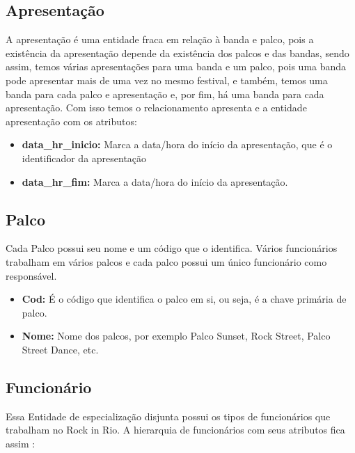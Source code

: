 \documentclass[12pt]{article}
\begin{document}
\subsection{Apresentação}

A apresentação é uma entidade fraca em relação à banda e palco, pois a existência da apresentação depende da existência dos palcos e das bandas, sendo assim, temos várias apresentações para uma banda e um palco, pois uma banda pode apresentar mais de uma vez no mesmo festival, e também, temos uma banda para cada palco e apresentação e, por fim, há uma banda para cada apresentação\cite{Diego}. Com isso temos o relacionamento apresenta e a entidade apresentação com os atributos:
\begin{itemize}
	\item \textbf{data\_hr\_inicio:} Marca a data/hora do início da apresentação, que é o identificador da apresentação
		\item \textbf{data\_hr\_fim:}  Marca a data/hora do início da apresentação.
\end{itemize}

\subsection{Palco}

Cada Palco possui seu nome e um código que o identifica. Vários funcionários trabalham em vários palcos e cada palco possui um único funcionário como responsável.
	\begin{itemize}
		\item \textbf{Cod:} É o código que identifica o palco em si, ou seja, é a chave primária de palco.
		\item \textbf{Nome:} Nome dos palcos, por exemplo Palco Sunset, Rock Street, Palco Street Dance, etc.
	\end{itemize}
	
\subsection{Funcionário}

Essa Entidade de especialização disjunta possui os tipos de funcionários que trabalham no Rock in Rio. A hierarquia de funcionários com seus atributos fica assim
\cite{elmasri2011sistemas}:
\end{document}
